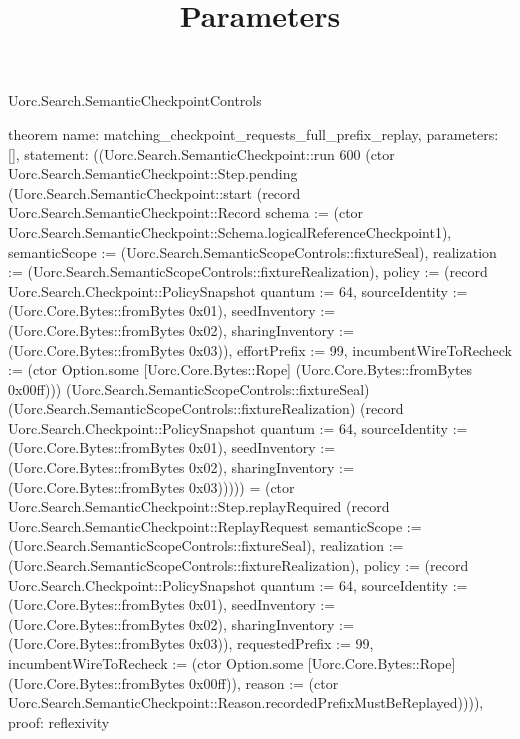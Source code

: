 \begin{lexlean}{Uorc.Search.SemanticCheckpointControls}
\title{Parameters}
\begin{semanticmodule}
theorem{
  name: matching_checkpoint_requests_full_prefix_replay,
  parameters: [],
  statement: ((Uorc.Search.SemanticCheckpoint::run 600 (ctor Uorc.Search.SemanticCheckpoint::Step.pending (Uorc.Search.SemanticCheckpoint::start (record Uorc.Search.SemanticCheckpoint::Record {schema := (ctor Uorc.Search.SemanticCheckpoint::Schema.logicalReferenceCheckpoint1), semanticScope := (Uorc.Search.SemanticScopeControls::fixtureSeal), realization := (Uorc.Search.SemanticScopeControls::fixtureRealization), policy := (record Uorc.Search.Checkpoint::PolicySnapshot {quantum := 64, sourceIdentity := (Uorc.Core.Bytes::fromBytes 0x01), seedInventory := (Uorc.Core.Bytes::fromBytes 0x02), sharingInventory := (Uorc.Core.Bytes::fromBytes 0x03)}), effortPrefix := 99, incumbentWireToRecheck := (ctor Option.some [Uorc.Core.Bytes::Rope] (Uorc.Core.Bytes::fromBytes 0x00ff))}) (Uorc.Search.SemanticScopeControls::fixtureSeal) (Uorc.Search.SemanticScopeControls::fixtureRealization) (record Uorc.Search.Checkpoint::PolicySnapshot {quantum := 64, sourceIdentity := (Uorc.Core.Bytes::fromBytes 0x01), seedInventory := (Uorc.Core.Bytes::fromBytes 0x02), sharingInventory := (Uorc.Core.Bytes::fromBytes 0x03)})))) = (ctor Uorc.Search.SemanticCheckpoint::Step.replayRequired (record Uorc.Search.SemanticCheckpoint::ReplayRequest {semanticScope := (Uorc.Search.SemanticScopeControls::fixtureSeal), realization := (Uorc.Search.SemanticScopeControls::fixtureRealization), policy := (record Uorc.Search.Checkpoint::PolicySnapshot {quantum := 64, sourceIdentity := (Uorc.Core.Bytes::fromBytes 0x01), seedInventory := (Uorc.Core.Bytes::fromBytes 0x02), sharingInventory := (Uorc.Core.Bytes::fromBytes 0x03)}), requestedPrefix := 99, incumbentWireToRecheck := (ctor Option.some [Uorc.Core.Bytes::Rope] (Uorc.Core.Bytes::fromBytes 0x00ff)), reason := (ctor Uorc.Search.SemanticCheckpoint::Reason.recordedPrefixMustBeReplayed)}))),
  proof: reflexivity{}
}


\end{semanticmodule}
\end{lexlean}
